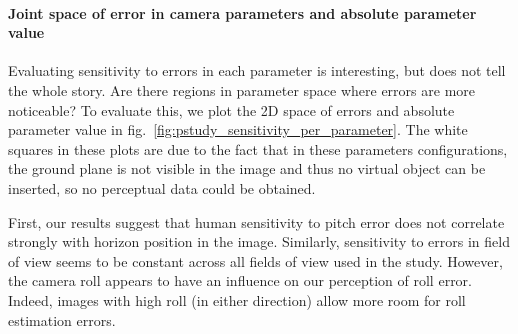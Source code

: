 \paragraph{Joint space of error in camera parameters and absolute parameter value}

Evaluating sensitivity to errors in each parameter is interesting, but does not tell the whole story. Are there regions in parameter space where errors are more noticeable? To evaluate this, we plot the 2D space of errors and absolute parameter value in fig.~\ref{fig:pstudy_sensitivity_per_parameter}. The white squares in these plots are due to the fact that in these parameters configurations, the ground plane is not visible in the image and thus no virtual object can be inserted, so no perceptual data could be obtained.

First, our results suggest that human sensitivity to pitch error does not correlate strongly with horizon position in the image. Similarly, sensitivity to errors in field of view seems to be constant across all fields of view used in the study. However, the camera roll appears to have an influence on our perception of roll error. Indeed, images with high roll (in either direction) allow more room for roll estimation errors. 

